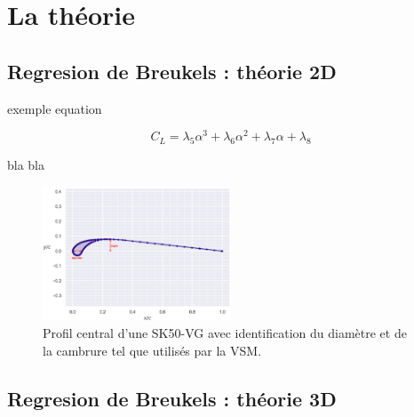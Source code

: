 \section{La théorie}
\label{sec:Ch1}

\subsection{\textbf{Regresion de Breukels : théorie 2D}} 
\label{sec:Ch1.1}

exemple equation
\begin{center}
    \begin{equation}
        C_L = \lambda_5  \alpha^3 +\lambda_6  \alpha^2 + \lambda_7  \alpha + \lambda_8
        \label{eq:Cl_breukels}
    \end{equation}
\end{center}


bla bla 

\begin{figure}[H]
    \centering
    \includegraphics[width=0.5\textwidth]{Pics/01 - Example/airfoil.png}  
    \caption{Profil central d'une SK50-VG avec identification du diamètre et de la cambrure tel que utilisés par la VSM.}
    \label{fig:airfoil}
\end{figure}

\subsection{\textbf{Regresion de Breukels : théorie 3D}} 
\label{sec:Ch1.2}
